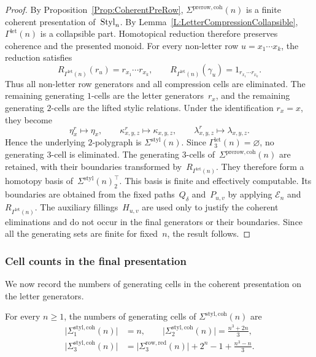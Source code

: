 \documentclass[a4paper, twoside, 11pt, english]{article}
\begin{document}
\begin{proof}
By Proposition~\ref{Prop:CoherentPreRow},
$\Sigma^{\mathrm{prerow,coh}}(n)$ is a finite coherent presentation
of~$\mathrm{Styl}_n$. By
Lemma~\ref{L:LetterCompressionCollapsible},
$\Gamma^{\mathrm{let}}(n)$ is a collapsible part. Homotopical
reduction therefore preserves coherence and the presented monoid.
For every non-letter row $u=x_1\cdots x_k$, the reduction satisfies
\[
R_{\Gamma^{\mathrm{let}}(n)}(r_u)
=
r_{x_1}\cdots r_{x_k},
\qquad
R_{\Gamma^{\mathrm{let}}(n)}(\gamma_u)
=
1_{r_{x_1}\cdots r_{x_k}}.
\]
Thus all non-letter row generators and all compression cells are
eliminated. The remaining generating $1$-cells are the letter
generators~$r_x$, and the remaining generating $2$-cells are the
lifted stylic relations. Under the identification $r_x=x$, they become
\[
\eta_x^r\longmapsto\eta_x,
\qquad
\kappa_{x,y,z}^r\longmapsto\kappa_{x,y,z},
\qquad
\lambda_{x,y,z}^r\longmapsto\lambda_{x,y,z}.
\]
Hence the underlying $2$-polygraph is
$\Sigma^{\mathrm{styl}}(n)$.
Since $\Gamma^{\mathrm{let}}_3(n)=\varnothing$, no generating
$3$-cell is eliminated. The generating $3$-cells of~$\Sigma^{\mathrm{prerow,coh}}(n)$ are retained, with their boundaries
transformed by~$R_{\Gamma^{\mathrm{let}}(n)}$. They therefore form a
homotopy basis of~$\Sigma^{\mathrm{styl}}(n)_2^\top$.
This basis is finite and effectively computable. Its boundaries are
obtained from the fixed paths~$Q_\delta$ and~$P_{u,v}$ by applying
$\mathcal E_n$ and
$R_{\Gamma^{\mathrm{let}}(n)}$. The auxiliary fillings~$H_{u,v}$ are
used only to justify the coherent eliminations and do not occur in the
final generators or their boundaries. Since all the generating sets
are finite for fixed~$n$, the result follows.
\end{proof}


\subsubsection{Cell counts in the final presentation}
We now record the numbers of generating cells in the coherent presentation on the letter generators.

\begin{proposition}
\label{P:FinalLetterCellCounts}
For every $n\geq1$, the numbers of generating cells of
$\Sigma^{\mathrm{styl,coh}}(n)$ are
\[
\begin{aligned}
\bigl|\Sigma^{\mathrm{styl,coh}}_1(n)\bigr|
&=n,
\qquad
\bigl|\Sigma^{\mathrm{styl,coh}}_2(n)\bigr|
=\frac{n^3+2n}{3},
\\
\bigl|\Sigma^{\mathrm{styl,coh}}_3(n)\bigr|
&=
\bigl|\Sigma^{\mathrm{row,red}}_3(n)\bigr|
+
2^n-1+\frac{n^3-n}{3}.
\end{aligned}
\]
\end{proposition}
\end{document}
